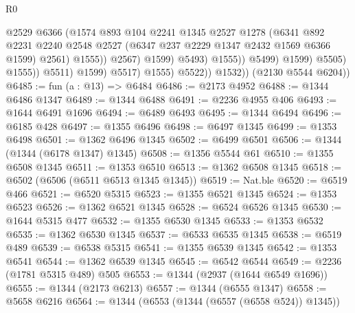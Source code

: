 \begin{lexlean}{R0}
\begin{coremodule}
                                            @2529
                                            @6366
                                            (@1574
                                              @893
                                              @104
                                              @2241
                                              @1345
                                              @2527
                                              @1278
                                              (@6341
                                                @892
                                                @2231
                                                @2240
                                                @2548
                                                @2527
                                                (@6347 @237 @2229 @1347 @2432 @1569 @6366 @1599)
                                                @2561)
                                              @1555))
                                          @2567)
                                        @1599)
                                      @5493)
                                    @1555))
                                @5499)
                              @1599)
                            @5505)
                          @1555))
                      @5511)
                    @1599)
                  @5517)
                @1555)
              @5522))
          @1532))
      (@2130 @5544 @6204))
@6485 := fun (a : @13) => @6484
@6486 := @2173 @4952
@6488 := @1344 @6486 @1347
@6489 := @1344 @6488
@6491 := @2236 @4955 @406
@6493 := @1644 @6491 @1696
@6494 := @6489 @6493
@6495 := @1344 @6494
@6496 := @6185 @428
@6497 := @1355 @6496
@6498 := @6497 @1345
@6499 := @1353 @6498
@6501 := @1362 @6496 @1345
@6502 := @6499 @6501
@6506 := @1344 (@1344 (@6178 @1347) @1345)
@6508 := @1356 @5544 @61
@6510 := @1355 @6508 @1345
@6511 := @1353 @6510
@6513 := @1362 @6508 @1345
@6518 := @6502 (@6506 (@6511 @6513 @1345 @1345))
@6519 := Nat.ble
@6520 := @6519 @466
@6521 := @6520 @5315
@6523 := @1355 @6521 @1345
@6524 := @1353 @6523
@6526 := @1362 @6521 @1345
@6528 := @6524 @6526 @1345
@6530 := @1644 @5315 @477
@6532 := @1355 @6530 @1345
@6533 := @1353 @6532
@6535 := @1362 @6530 @1345
@6537 := @6533 @6535 @1345
@6538 := @6519 @489
@6539 := @6538 @5315
@6541 := @1355 @6539 @1345
@6542 := @1353 @6541
@6544 := @1362 @6539 @1345
@6545 := @6542 @6544
@6549 := @2236 (@1781 @5315 @489) @505
@6553 := @1344 (@2937 (@1644 @6549 @1696))
@6555 := @1344 (@2173 @6213)
@6557 := @1344 (@6555 @1347)
@6558 := @5658 @6216
@6564 := @1344 (@6553 (@1344 (@6557 (@6558 @524)) @1345))

\end{coremodule}
\end{lexlean}
